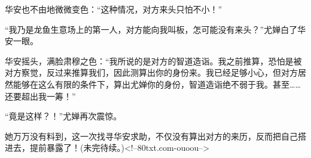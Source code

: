 \begin{this_body}
华安也不由地微微变色：“这种情况，对方来头只怕不小！”

“我乃是龙鱼生意场上的第一人，对方能向我叫板，怎可能没有来头？”尤婵白了华安一眼。

华安摇头，满脸肃穆之色：“我所说的是对方的智道造诣。我之前推算，恐怕是被对方察觉，反过来推算我们，因此测算出你的身份来。我已经足够小心，但对方居然能够在这么有限的条件下，算出尤婵你的身份，智道造诣绝不弱于我。甚至……还要超出我一筹！”

“竟是这样？！”尤婵再次震惊。

她万万没有料到，这一次找寻华安求助，不仅没有算出对方的来历，反而把自己搭进去，提前暴露了！(未完待续。)<!--80txt.com-ouoou-->

\end{this_body}


